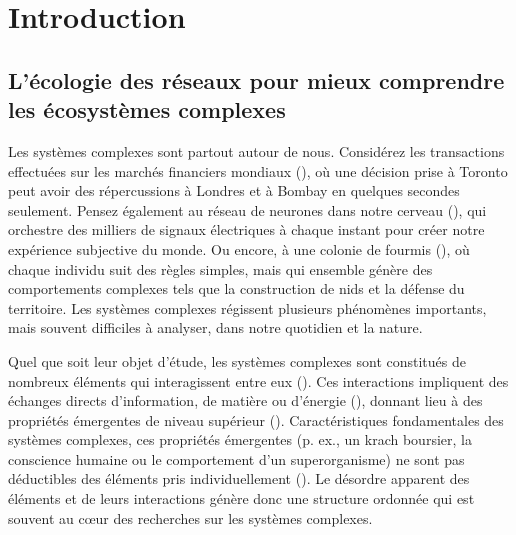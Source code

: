 
\francais   
\doublespacing
\chapter*{Introduction}



\section{L'écologie des réseaux pour mieux comprendre les écosystèmes complexes}

Les systèmes complexes sont partout autour de nous. Considérez les transactions
effectuées sur les marchés financiers mondiaux (\cite{Anderson2018Economy}), où
une décision prise à Toronto peut avoir des répercussions à Londres et à Bombay
en quelques secondes seulement. Pensez également au réseau de neurones dans
notre cerveau (\cite{Sporns2011Human}), qui orchestre des milliers de signaux
électriques à chaque instant pour créer notre expérience subjective du monde. Ou
encore, à une colonie de fourmis (\cite{Bonabeau1999Swarm}), où chaque individu
suit des règles simples, mais qui ensemble génère des comportements complexes
tels que la construction de nids et la défense du territoire. Les systèmes
complexes régissent plusieurs phénomènes importants, mais souvent difficiles à
analyser, dans notre quotidien et la nature. 

Quel que soit leur objet d'étude, les systèmes complexes sont constitués de
nombreux éléments qui interagissent entre eux (\cite{Rind1999Complexity}). Ces
interactions impliquent des échanges directs d'information, de matière ou
d'énergie (\cite{Ladyman2013What}), donnant lieu à des propriétés émergentes de
niveau supérieur (\cite{Foote2007Mathematics}). Caractéristiques fondamentales
des systèmes complexes, ces propriétés émergentes (p. ex., un krach boursier, la
conscience humaine ou le comportement d'un superorganisme) ne sont pas
déductibles des éléments pris individuellement (\cite{Nielsen2000Emergent}). Le
désordre apparent des éléments et de leurs interactions génère donc une
structure ordonnée qui est souvent au cœur des recherches sur les systèmes
complexes. 

